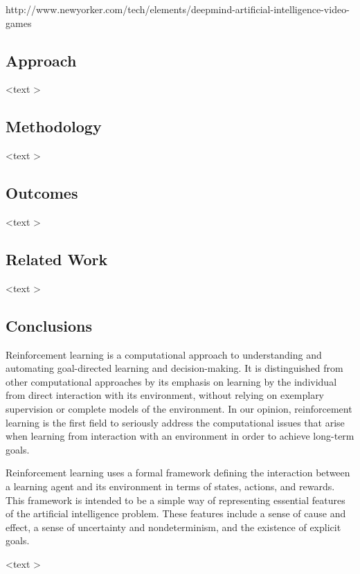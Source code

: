 \documentclass{article}
\begin{document}
http://www.newyorker.com/tech/elements/deepmind-artificial-intelligence-video-games
 
 \vspace{12pt}
\subsection*{{ {\textbf{Approach}}}}

  
  {<}text {>}
 
 \vspace{12pt}
\subsection*{{ {\textbf{Methodology}}}}

  
  {<}text {>}
 
 \vspace{12pt}
\subsection*{{ {\textbf{Outcomes}}}}

  
  {<}text {>}
 
 \vspace{12pt}
\subsection*{{ {\textbf{Related Work}}}}
 
 {<}text {>}

\vspace{12pt}
 
\subsection*{{  {\textbf{Conclusions}}}}

Reinforcement learning is a computational approach to understanding and automating
goal-directed learning and decision-making. It is distinguished from
other computational approaches by its emphasis on learning by the individual
from direct interaction with its environment, without relying on exemplary
supervision or complete models of the environment. In our opinion, reinforcement
learning is the first field to seriously address the computational issues
that arise when learning from interaction with an environment in order to
achieve long-term goals.

Reinforcement learning uses a formal framework defining the interaction
between a learning agent and its environment in terms of states, actions, and
rewards. This framework is intended to be a simple way of representing essential
features of the artificial intelligence problem. These features include a sense of cause and effect, a sense of uncertainty and nondeterminism, and the
existence of explicit goals.

  
  {<}text {>}
 
 \vspace{12pt}




\newpage
\end{document}
